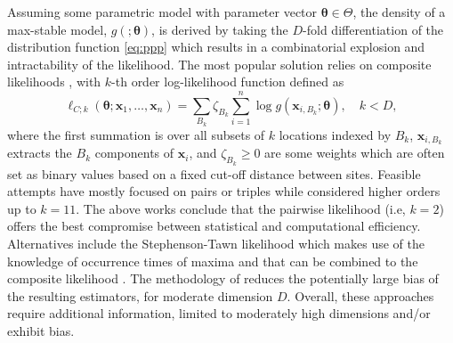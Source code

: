 \documentclass[12pt]{article}
\begin{document}
Assuming some parametric model with parameter vector $\bm \theta \in \Theta$, the density of a max-stable model, $g(;\bm \theta)$, is derived by taking the $D$-fold differentiation of the distribution function \eqref{eq:ppp} which results in a combinatorial explosion and intractability of the likelihood. The most popular solution relies on composite likelihoods \citep{Padoan.etal:2010, Sang.Genton:2014}, with $k$-th order log-likelihood function defined as
%
\begin{equation}
\label{eq:composite}
\ell_{C;k}(\bm \theta;\bm x_1,\dots,\bm x_n)
=\sum_{B_k} \zeta_{B_k} \sum_{i=1}^n\log g(\bm x_{i,B_k};\bm \theta), \quad k< D,
\end{equation}
%
where the first summation is over all subsets of $k$ locations indexed by $B_k$, $\bm x_{i,B_k}$ extracts the $B_k$ components of $\bm x_i$, and $\zeta_{B_k} \geq 0$ are some weights which are often set as binary values based on a fixed cut-off distance between sites. 
Feasible attempts have mostly focused on pairs or triples \citep{Padoan.etal:2010, Huser.Davison:2013a} while \citet{Castruccio.etal:2016} considered higher orders up to $k=11$. The above works conclude that the pairwise likelihood (i.e, $k=2$) offers the best compromise between statistical and computational efficiency.
Alternatives include the Stephenson-Tawn likelihood which makes use of the knowledge of occurrence times of maxima 
\citep{Stephenson.Tawn:2005, Wadsworth.Tawn:2014} and that can be combined to the composite likelihood \citep{Beranger.etal:2021}. The methodology of \citet{Wadsworth:2015} reduces the potentially large bias of the resulting estimators, for moderate dimension $D$. Overall, these approaches require additional information, limited to moderately high dimensions and/or exhibit bias.
\end{document}
